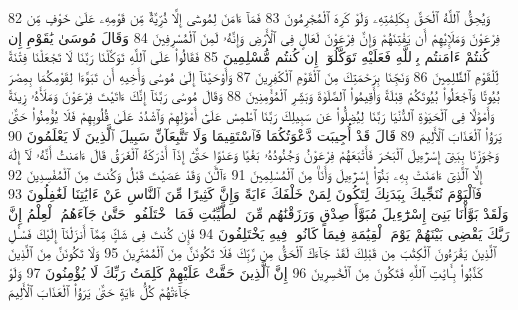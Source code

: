 {\tiny\colorbox{cl_aya}{82}} وَيُحِقُّ ٱللَّهُ ٱلْحَقَّ بِكَلِمَٰتِهِۦ وَلَوْ كَرِهَ ٱلْمُجْرِمُونَ
{\tiny\colorbox{cl_aya}{83}} فَمَآ ءَامَنَ لِمُوسَىٰٓ إِلَّا ذُرِّيَّةٌ مِّن قَوْمِهِۦ عَلَىٰ خَوْفٍ مِّن فِرْعَوْنَ وَمَلَإِي۟هِمْ أَن يَفْتِنَهُمْ وَإِنَّ فِرْعَوْنَ لَعَالٍ فِى ٱلْأَرْضِ وَإِنَّهُۥ لَمِنَ ٱلْمُسْرِفِينَ
{\tiny\colorbox{cl_aya}{84}} وَقَالَ مُوسَىٰ يَٰقَوْمِ إِن كُنتُمْ ءَامَنتُم بِٱللَّهِ فَعَلَيْهِ تَوَكَّلُوٓا۟ إِن كُنتُم مُّسْلِمِينَ
{\tiny\colorbox{cl_aya}{85}} فَقَالُوا۟ عَلَى ٱللَّهِ تَوَكَّلْنَا رَبَّنَا لَا تَجْعَلْنَا فِتْنَةً لِّلْقَوْمِ ٱلظَّٰلِمِينَ
{\tiny\colorbox{cl_aya}{86}} وَنَجِّنَا بِرَحْمَتِكَ مِنَ ٱلْقَوْمِ ٱلْكَٰفِرِينَ
{\tiny\colorbox{cl_aya}{87}} وَأَوْحَيْنَآ إِلَىٰ مُوسَىٰ وَأَخِيهِ أَن تَبَوَّءَا لِقَوْمِكُمَا بِمِصْرَ بُيُوتًا وَٱجْعَلُوا۟ بُيُوتَكُمْ قِبْلَةً وَأَقِيمُوا۟ ٱلصَّلَوٰةَ وَبَشِّرِ ٱلْمُؤْمِنِينَ
{\tiny\colorbox{cl_aya}{88}} وَقَالَ مُوسَىٰ رَبَّنَآ إِنَّكَ ءَاتَيْتَ فِرْعَوْنَ وَمَلَأَهُۥ زِينَةً وَأَمْوَٰلًا فِى ٱلْحَيَوٰةِ ٱلدُّنْيَا رَبَّنَا لِيُضِلُّوا۟ عَن سَبِيلِكَ رَبَّنَا ٱطْمِسْ عَلَىٰٓ أَمْوَٰلِهِمْ وَٱشْدُدْ عَلَىٰ قُلُوبِهِمْ فَلَا يُؤْمِنُوا۟ حَتَّىٰ يَرَوُا۟ ٱلْعَذَابَ ٱلْأَلِيمَ
{\tiny\colorbox{cl_aya}{89}} قَالَ قَدْ أُجِيبَت دَّعْوَتُكُمَا فَٱسْتَقِيمَا وَلَا تَتَّبِعَآنِّ سَبِيلَ ٱلَّذِينَ لَا يَعْلَمُونَ
{\tiny\colorbox{cl_aya}{90}} وَجَٰوَزْنَا بِبَنِىٓ إِسْرَٰٓءِيلَ ٱلْبَحْرَ فَأَتْبَعَهُمْ فِرْعَوْنُ وَجُنُودُهُۥ بَغْيًا وَعَدْوًا حَتَّىٰٓ إِذَآ أَدْرَكَهُ ٱلْغَرَقُ قَالَ ءَامَنتُ أَنَّهُۥ لَآ إِلَٰهَ إِلَّا ٱلَّذِىٓ ءَامَنَتْ بِهِۦ بَنُوٓا۟ إِسْرَٰٓءِيلَ وَأَنَا۠ مِنَ ٱلْمُسْلِمِينَ
{\tiny\colorbox{cl_aya}{91}} ءَآلْـَٰٔنَ وَقَدْ عَصَيْتَ قَبْلُ وَكُنتَ مِنَ ٱلْمُفْسِدِينَ
{\tiny\colorbox{cl_aya}{92}} فَٱلْيَوْمَ نُنَجِّيكَ بِبَدَنِكَ لِتَكُونَ لِمَنْ خَلْفَكَ ءَايَةً وَإِنَّ كَثِيرًا مِّنَ ٱلنَّاسِ عَنْ ءَايَٰتِنَا لَغَٰفِلُونَ
{\tiny\colorbox{cl_aya}{93}} وَلَقَدْ بَوَّأْنَا بَنِىٓ إِسْرَٰٓءِيلَ مُبَوَّأَ صِدْقٍ وَرَزَقْنَٰهُم مِّنَ ٱلطَّيِّبَٰتِ فَمَا ٱخْتَلَفُوا۟ حَتَّىٰ جَآءَهُمُ ٱلْعِلْمُ إِنَّ رَبَّكَ يَقْضِى بَيْنَهُمْ يَوْمَ ٱلْقِيَٰمَةِ فِيمَا كَانُوا۟ فِيهِ يَخْتَلِفُونَ
{\tiny\colorbox{cl_aya}{94}} فَإِن كُنتَ فِى شَكٍّ مِّمَّآ أَنزَلْنَآ إِلَيْكَ فَسْـَٔلِ ٱلَّذِينَ يَقْرَءُونَ ٱلْكِتَٰبَ مِن قَبْلِكَ لَقَدْ جَآءَكَ ٱلْحَقُّ مِن رَّبِّكَ فَلَا تَكُونَنَّ مِنَ ٱلْمُمْتَرِينَ
{\tiny\colorbox{cl_aya}{95}} وَلَا تَكُونَنَّ مِنَ ٱلَّذِينَ كَذَّبُوا۟ بِـَٔايَٰتِ ٱللَّهِ فَتَكُونَ مِنَ ٱلْخَٰسِرِينَ
{\tiny\colorbox{cl_aya}{96}} إِنَّ ٱلَّذِينَ حَقَّتْ عَلَيْهِمْ كَلِمَتُ رَبِّكَ لَا يُؤْمِنُونَ
{\tiny\colorbox{cl_aya}{97}} وَلَوْ جَآءَتْهُمْ كُلُّ ءَايَةٍ حَتَّىٰ يَرَوُا۟ ٱلْعَذَابَ ٱلْأَلِيمَ

